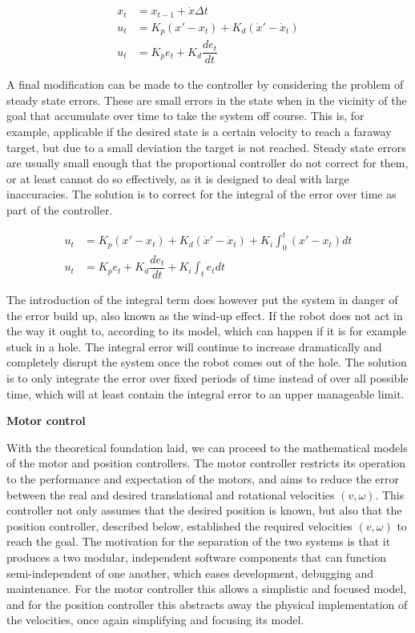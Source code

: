 \begin{align}
    x_t &= x_{t-1} + \Dot{x}\Delta t
    \label{eq:pd-model} \\
    u_t &= K_p (x' - x_t) + K_d (\Dot{x}' - \Dot{x}_t) \\
    u_t &= K_p e_t + K_d \dfrac{de_t}{dt}
\end{align}

A final modification can be made to the controller by considering the problem of steady state errors. These are small errors in the state when in the vicinity of the goal that accumulate over time to take the system off course. This is, for example, applicable if the desired state is a certain velocity to reach a faraway target, but due to a small deviation the target is not reached. Steady state errors are usually small enough that the proportional controller do not correct for them, or at least cannot do so effectively, as it is designed to deal with large inaccuracies. The solution is to correct for the integral of the error over time as part of the controller.

\begin{align}
    u_t &= K_p (x' - x_t) + K_d (\Dot{x}' - \Dot{x}_t) + K_i \int_0^t (x' - x_t) dt \\
    u_t &= K_p e_t + K_d \dfrac{de_t}{dt} + K_i \int_t e_t dt
\end{align}

The introduction of the integral term does however put the system in danger of the error build up, also known as the wind-up effect. If the robot does not act in the way it ought to, according to its model, which can happen if it is for example stuck in a hole. The integral error will continue to increase dramatically and completely disrupt the system once the robot comes out of the hole. The solution is to only integrate the error over fixed periods of time instead of over all possible time, which will at least contain the integral error to an upper manageable limit.

\textbf{Motor control}

With the theoretical foundation laid, we can proceed to the mathematical models of the motor and position controllers. The motor controller restricts its operation to the performance and expectation of the motors, and aims to reduce the error between the real and desired translational and rotational velocities $(v,\omega)$. This controller not only assumes that the desired position is known, but also that the position controller, described below, established the required velocities $(v,\omega)$ to reach the goal. The motivation for the separation of the two systems is that it produces a two modular, independent software components that can function semi-independent of one another, which eases development, debugging and maintenance. For the motor controller this allows a simplistic and focused model, and for the position controller this abstracts away the physical implementation of the velocities, once again simplifying and focusing its model.

